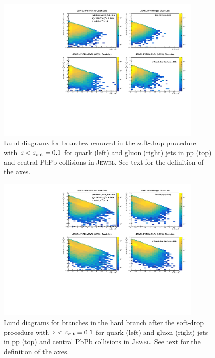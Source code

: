 \documentclass[notoc,preprintnumbers]{JHEP3}
\begin{document}
\begin{figure}[t]
	\centering
	\includegraphics[width=0.9\textwidth]{plots/Individual_LundDiagrams_zrel_background.pdf}
	\caption{Lund diagrams for branches removed in the soft-drop procedure with $z<z_{\rm cut}=0.1$ for quark (left) and gluon (right) jets in pp (top) and central PbPb collisions in \textsc{Jewel}. See text for the definition of the axes.}
\label{fig:Lund_bkg}
\end{figure}

\begin{figure}[t]
	   \centering
	   \includegraphics[width=0.9\textwidth]{plots/Individual_LundDiagrams_zrel_hardBranch.pdf}
	   \caption{Lund diagrams for branches in the hard branch after the soft-drop procedure with $z<z_{\rm cut}=0.1$ for quark (left) and gluon (right) jets in pp (top) and central PbPb collisions in \textsc{Jewel}. See text for the definition of the axes.}
\label{fig:Lund_hard}
\end{figure}
\end{document}
